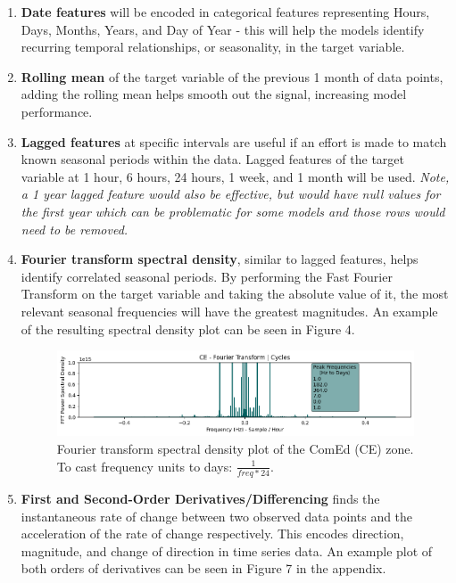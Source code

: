 \documentclass[sigconf]{acmart}
\begin{document}
  \begin{enumerate}
  \item \textbf{Date features} will be encoded in categorical features representing Hours, Days, Months, Years, and Day of Year - this will help the models identify recurring temporal relationships, or seasonality, in the target variable.
  \item \textbf{Rolling mean} of the target variable of the previous 1 month of data points, adding the rolling mean helps smooth out the signal, increasing model performance. 
  \item \textbf{Lagged features} at specific intervals are useful if an effort is made to match known seasonal periods within the data. Lagged features of the target variable at 1 hour, 6 hours, 24 hours, 1 week, and 1 month will be used. \textit{Note, a 1 year lagged feature would also be effective, but would have null values for the first year which can be problematic for some models and those rows would need to be removed.}
  \item \textbf{Fourier transform spectral density}, similar to lagged features, helps identify correlated seasonal periods. By performing the Fast Fourier Transform on the target variable and taking the absolute value of it, the most relevant seasonal frequencies will have the greatest magnitudes. An example of the resulting spectral density plot can be seen in Figure 4.
  
    \begin{figure}[hbt!]
    \includegraphics[width=\linewidth]{Images/FFT_Plot.png}
    \caption{Fourier transform spectral density plot of the ComEd (CE) zone. To cast frequency units to days: $\frac{1}{freq*24}$.}
    \Description{}
    \label{fig:fft}
  \end{figure}
  
  \item \textbf{First and Second-Order Derivatives/Differencing} finds the instantaneous rate of change between two observed data points and the acceleration of the rate of change respectively. This encodes direction, magnitude, and change of direction in time series data. An example plot of both orders of derivatives can be seen in Figure 7 in the appendix.
\end{enumerate}
\end{document}
